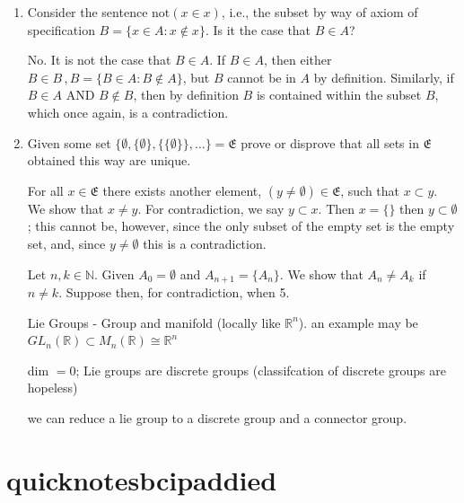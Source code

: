 \documentclass[12pt,oneside]{report}
\begin{document}
\begin{enumerate}
  \item Consider the sentence \( \text{not}(x \in x) \), i.e., the subset by way of axiom of specification \( B=\{ x\in A : x \not \in x \} \). Is it the case that \( B\in A \)? 

    No. It is not the case that \( B\in A \). If \( B\in A \), then either \(B\in B \, , B=\{B\in A : B\not \in A\} \), but \( B \) cannot be in \( A \) by definition. Similarly, if \( B \in A \) AND \( B\not\in B \), then by definition \( B \) is contained within the subset \( B \), which once again, is a contradiction. 










  \item Given some set \( \{ \emptyset, \{ \emptyset \}, \{\{\emptyset\}\},\ldots  \} =\mathfrak{E}\) prove or disprove that all sets in \( \mathfrak{E} \) obtained this way are unique. 

    For all \( x\in \mathfrak{E} \) there exists another element, \(( y\neq \emptyset )\in \mathfrak{E}\), such that \(x \subset y  \). We show that \( x\neq y \). For contradiction, we say \( y \subset  x \). Then \( x=\{ \} \) then \( y\subset \emptyset \); this cannot be, however, since the only subset of the empty set is the empty set, and, since \( y\neq \emptyset \) this is a contradiction. 


    Let \( n,k \in \mathbb{N} \). Given \( A_{0} = \emptyset\) and \( A_{n+1}=\{A_{n}\}\). We show that \( A_n\neq A_k \) if \( n\neq k \). Suppose then, for contradiction, when 5.


Lie Groups - Group and manifold (locally like \( \mathbb{R}^n \)). an example may be \( GL_n(\mathbb{R})\subset M_n (\mathbb{R}) \cong \mathbb{R}^n \)

dim \( =0 \); Lie groups are discrete groups (classifcation of discrete groups are hopeless)

we can reduce a lie group to a discrete group and a connector group. 

\end{enumerate}



\section{quicknotesbcipaddied}
\end{document}
